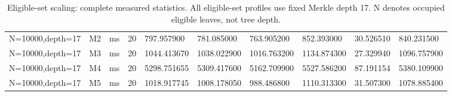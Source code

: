 \begin{table}[htbp]
{\begin{tabular}{llllllllll}
N=10000,depth=17 & M2 & ms & 20 & 797.957900 & 781.085000 & 763.905200 & 852.393000 & 30.526510 & 840.231500 \\
N=10000,depth=17 & M3 & ms & 20 & 1044.413670 & 1038.022900 & 1016.763200 & 1134.874300 & 27.329940 & 1096.757900 \\
N=10000,depth=17 & M4 & ms & 20 & 5298.751655 & 5309.417600 & 5162.709900 & 5527.586200 & 87.191154 & 5380.109900 \\
N=10000,depth=17 & M5 & ms & 20 & 1018.917745 & 1008.178050 & 988.486800 & 1110.313300 & 31.507300 & 1078.885400 \\
\hline
\end{tabular}%
}
\caption{Eligible-set scaling: complete measured statistics. All eligible-set profiles use fixed Merkle depth 17. N denotes occupied eligible leaves, not tree depth.}
\label{tab:t-pub-04}
\end{table}
